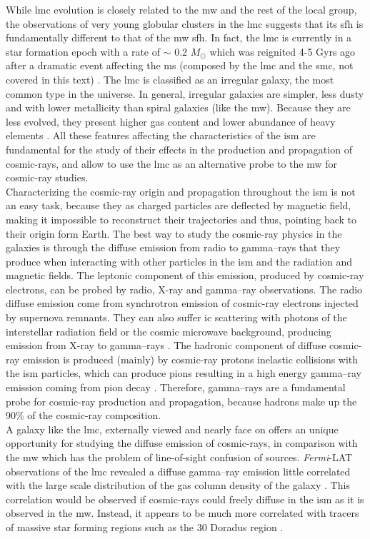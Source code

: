\documentclass{article}
\begin{document}
While \gls{lmc} evolution is closely related to the \gls{mw} and the rest of the local group, the observations of very young globular clusters in the \gls{lmc} suggests that its \gls{sfh} is fundamentally different to that of the \gls{mw} \gls{sfh}. In fact, the \gls{lmc} is currently in a star formation epoch with a rate of $\sim$ 0.2 $M_{\odot}$ which was reignited 4-5 Gyrs ago after a dramatic event affecting the \gls{ms} (composed by the \gls{lmc} and the \gls{smc}, not covered in this text) \cite{2009SFHofLMC}. The \gls{lmc} is classified as an irregular galaxy, the most common type in the universe. In general, irregular galaxies are simpler, less dusty and with lower metallicity than spiral galaxies (like the \gls{mw}). Because they are less evolved, they present higher gas content and lower abundance of heavy elements \cite{2013InfrarredLMC}. All these features affecting the characteristics of the \gls{ism} are fundamental for the study of their effects in the production and propagation of cosmic-rays, and allow to use the \gls{lmc} as an alternative probe to the \gls{mw} for cosmic-ray studies.\\
Characterizing the cosmic-ray origin and propagation throughout the \gls{ism} is not an easy task, because they as charged particles are deflected by magnetic field, making it impossible to reconstruct their trajectories and thus, pointing back to their origin form Earth. The best way to study the cosmic-ray physics in the galaxies is through the diffuse emission from radio to gamma--rays that they produce when interacting with other particles in the \gls{ism} and the radiation and magnetic fields. The leptonic component of this emission, produced by cosmic-ray electrons, can be probed by radio, X-ray and gamma--ray observations. The radio diffuse emission come from synchrotron emission of cosmic-ray electrons injected by supernova remnants. They can also suffer \gls{ic} scattering with photons of the interstellar radiation field or the cosmic microwave background, producing emission from X-ray to gamma--rays \cite{2008ICgammaray}. The hadronic component of diffuse cosmic-ray emission is produced (mainly) by cosmic-ray protons inelastic collisions with the \gls{ism} particles, which can produce pions resulting in a high energy gamma--ray emission coming from pion decay \cite{1963Pimesonsproducegammarays}. Therefore, gamma--rays are a fundamental probe for cosmic-ray production and propagation, because hadrons make up the 90\% of the cosmic-ray composition.\\ 
A galaxy like the \gls{lmc}, externally viewed and nearly face on offers an unique opportunity for studying the diffuse emission of cosmic-rays, in comparison with the \gls{mw} which has the problem of line-of-sight confusion of sources. \textit{Fermi}-LAT observations of the \gls{lmc} revealed a diffuse gamma--ray emission little correlated with the large scale distribution of the gas column density of the galaxy \cite{2010FermiLATLMC11months}. This correlation would be observed if cosmic-rays could freely diffuse in the \gls{ism} as it is observed in the \gls{mw}. Instead, it appears to be much more correlated with tracers of massive star forming regions such as the 30 Doradus region \cite{2012CRinLMC30Doradus}.\\
\end{document}
